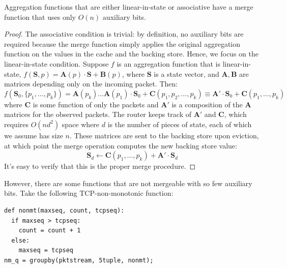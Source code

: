 \begin{theorem}
 Aggregation functions that are either linear-in-state or associative have a
merge function that uses only $O(n)$ auxiliary bits.
\end{theorem}
\begin{proof}
The associative condition is trivial: by definition, no auxiliary bits are required because the merge function simply applies the original aggregation function on the values in the cache and the backing store. Hence, we focus on the linear-in-state condition.
Suppose $f$ is an aggregation function that is linear-in-state, \ie $f(\mathbf{S}, p) = \mathbf{A}(p) \cdot \mathbf{S} + \mathbf{B}(p)$, where $\mathbf{S}$ is a state vector, and $\mathbf{A,B}$ are matrices depending only on the incoming packet. Then:
\[ f(\mathbf{S}_0, \{p_1, \ldots, p_k\}) = \mathbf{A}(p_k)\ldots \mathbf{A}(p_1) \cdot \mathbf{S}_0 + \mathbf{C}(p_1, p_2, \ldots, p_k) \equiv \mathbf{A'} \cdot \mathbf{S}_0 + \mathbf{C}(p_1, \ldots, p_k)\]
where $\mathbf{C}$ is some function of only the packets and $\mathbf{A'}$ is a composition of the $\mathbf{A}$ matrices for the observed packets. The router keeps track of $\mathbf{A'}$ and $\mathbf{C}$, which requires $O(nd^2)$ space where $d$ is the number of pieces of state, each of which we assume has size $n$. These matrices are sent to the backing store upon eviction, at which point the merge operation computes the new backing store value:
\[ \mathbf{S}_d \leftarrow \mathbf{C}(p_1, \ldots, p_k) + \mathbf{A'} \cdot \mathbf{S}_d \]
It's easy to verify that this is the proper merge procedure.
\end{proof}

However, there are some functions that are not mergeable with so few auxiliary bits. Take the following TCP-non-monotonic function:
\begin{verbatim}
def nonmt(maxseq, count, tcpseq):
  if maxseq > tcpseq:
    count = count + 1
  else:
    maxseq = tcpseq
nm_q = groupby(pktstream, 5tuple, nonmt);
\end{verbatim}

